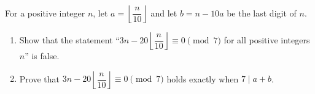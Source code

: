 For a positive integer $n$, let $a=\left\lfloor\dfrac n{10}\right\rfloor$ and let $b=n-10a$ be the last digit of $n$.
\begin{enumerate}
\item[(a)] Show that the statement ``$3n-20\left\lfloor\dfrac n{10}\right\rfloor\equiv0\pmod7$ for all positive integers $n$'' is false.
\item[(b)] Prove that $3n-20\left\lfloor\dfrac n{10}\right\rfloor\equiv0\pmod7$ holds exactly when $7\mid a+b$.
\end{enumerate}
